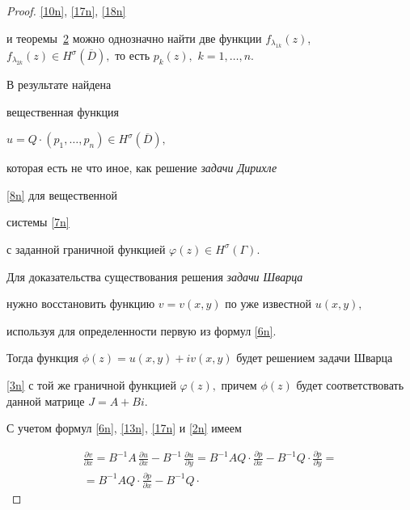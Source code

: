 \begin{proof}
 \eqref{10n}, \eqref{17n}, \eqref{18n}

 и теоремы~\hyperlink{nik:th2}{2} можно однозначно найти две  функции $f_{\lambda_{\scriptstyle 1k}}(z)$, $f_{\lambda_{\scriptstyle 2k}}(z)

\in H^\sigma(\overline{D}),$  то есть $p_k(z),$ $k=1,\ldots,n.$





В результате найдена

вещественная функция

$u=Q\cdot (p_1,\ldots,p_n)\in H^\sigma(\overline{D}),$

которая   есть не что иное, как решение {\it задачи Дирихле}

\eqref{8n} для вещественной

системы \eqref{7n}

 с заданной граничной функцией $\varphi(z)\in H^\sigma(\Gamma).$



\smallskip



    Для доказательства  существования решения {\it задачи Шварца }

нужно  восстановить функцию $v=v(x,y)$ по уже известной $u(x,y),$

  используя для определенности первую  из формул \eqref{6n}. 

  Тогда   функция $\phi(z)=u(x,y)+iv(x,y)$ будет решением задачи Шварца

  \eqref{3n} с той же граничной функцией $\varphi(z),$ причем $\phi(z)$ будет соответствовать данной матрице $J=A+Bi.$





С  учетом формул \eqref{6n}, \eqref{13n},  \eqref{17n} и \eqref{2n}  имеем

\begin{multline}

\frac{\partial v}{\partial x}=B^{-1}A\,

\frac{\partial u}{\partial x}

-B^{-1}\,\frac{\partial u}{\partial y}=

B^{-1}AQ\cdot\frac{\partial p}{\partial x}

-B^{-1}Q\cdot\frac{\partial p}{\partial y}=

\\

 = B^{-1}AQ\cdot\frac{\partial p}{\partial x}-B^{-1}Q\cdot


\end{multline}
\end{proof}
